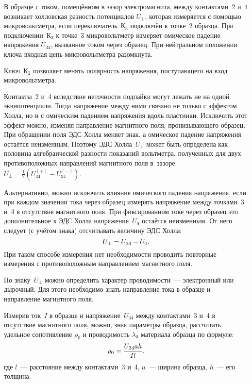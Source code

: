 В образце с током, помещённом в зазор электромагнита, между контактами~2 и~4
возникает холловская разность потенциалов $U_{\perp}$, которая измеряется с помощью
микровольтметра, если переключатель~К$_3$ подключён к точке~2 образца. При
подключении~К$_3$ к точке~3 микровольтметр измеряет омическое падение напряжения
$U_{34}$, вызванное током через образец. При нейтральном положении
ключа входная цепь микровольтметра разомкнута.

Ключ~К$_2$ позволяет менять полярность напряжения, поступающего на вход
микровольтметра.

Контакты~2 и~4 вследствие неточности подпайки могут лежать не на одной
эквипотенциали. Тогда напряжение между ними связано не только с эффектом
Холла, но и с омическим падением напряжения вдоль пластинки. 
Исключить этот эффект можно, изменяя направление магнитного поля, 
пронизывающего образец. 
При обращении поля ЭДС Холла меняет знак, а омическое падение напряжения
остаётся неизменным. Поэтому ЭДС Холла~$U_{\perp}$ может быть определена
как половина алгебраической разности показаний вольтметра, полученных для двух
противоположных направлений магнитного поля в~зазоре:
$U_{\perp} = \frac12 (U_{34}^{(+)}-U_{34}^{(-)})$.

Альтернативно, можно исключить влияние омического падения напряжения, 
если при каждом значении тока через образец измерять напряжение
между точками~3 и~4 в отсутствие магнитного поля. При фиксированном токе через
образец это дополнительное к ЭДС Холла напряжение~$U_0$ остаётся неизменным. 
От него следует (с учётом знака) отсчитывать величину ЭДС Холла:
\begin{equation}
U_{\perp} = U_{24} - U_0.
\eqmark{3.5.1}
\end{equation}
При таком способе измерения нет необходимости проводить повторные измерения
с противоположным направлением магнитного поля.

По знаку~$U_{\perp}$ можно определить характер проводимости~--- электронный или
дырочный. Для этого необходимо знать направление тока в образце и направление
магнитного поля.

Измерив ток~$I$ в образце и напряжение~$U_{34}$ между контактами~3 и~4 в
отсутствие магнитного поля, можно, зная параметры образца, рассчитать удельное
сопотивление $\rho_0$ и проводимость $\lambda_0$ материала образца по формуле:
\begin{equation}
	\rho_0=\frac{U_{34}ah}{Il},
	\eqmark{3.5.2}
\end{equation}
где $l$~--- расстояние между контактами~3 и~4, $a$~--- ширина образца, $h$~---
его толщина.

